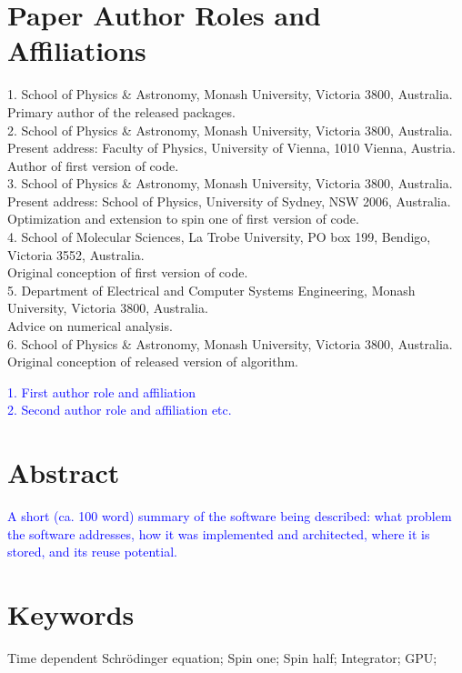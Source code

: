 \documentclass{jors}
\begin{document}
\section*{Paper Author Roles and Affiliations}
1. School of Physics \& Astronomy, Monash University, Victoria 3800, Australia.\\
	Primary author of the released packages.\\
2. School of Physics \& Astronomy, Monash University, Victoria 3800, Australia.\\
	Present address: Faculty of Physics, University of Vienna, 1010 Vienna, Austria.\\
	Author of first version of code.\\
3. School of Physics \& Astronomy, Monash University, Victoria 3800, Australia.\\
	Present address: School of Physics, University of Sydney, NSW 2006, Australia.\\
	Optimization and extension to spin one of first version of code.\\
4. School of Molecular Sciences, La Trobe University, PO box 199, Bendigo, Victoria 3552, Australia.\\
	Original conception of first version of code.\\
5. Department of Electrical and Computer Systems Engineering, Monash University, Victoria 3800, Australia.\\
	Advice on numerical analysis.\\
6. School of Physics \& Astronomy, Monash University, Victoria 3800, Australia.\\
	Original conception of released version of algorithm.

\textcolor{blue}{1. First author role and affiliation \\
2. Second author role and affiliation etc.}

\section*{Abstract}

\textcolor{blue}{A short (ca. 100 word) summary of the software being described: what problem the software addresses, how it was implemented and architected, where it is stored, and its reuse potential.}

\section*{Keywords}
Time dependent Schrödinger equation; Spin one; Spin half; Integrator; GPU;\\
\end{document}
